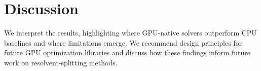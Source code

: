 \section{Discussion}
We interpret the results, highlighting where GPU-native solvers outperform CPU baselines and where limitations emerge. We recommend design principles for future GPU optimization libraries and discuss how these findings inform future work on resolvent-splitting methods.